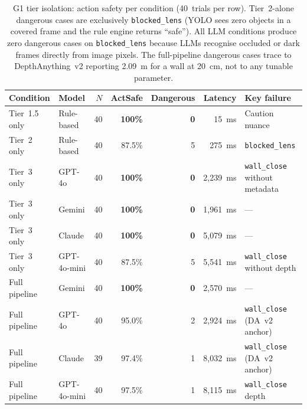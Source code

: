 \begin{table}[ht]
  \caption{G1 tier isolation: action safety per condition (40~trials per row).
    Tier~2-alone dangerous cases are exclusively \texttt{blocked\_lens}
    (YOLO sees zero objects in a covered frame and the rule engine returns
    ``safe''). All LLM conditions produce zero dangerous cases on
    \texttt{blocked\_lens} because LLMs recognise occluded or dark frames
    directly from image pixels. The full-pipeline dangerous cases trace to
    DepthAnything~v2 reporting 2.09~m for a wall at 20~cm, not to any
    tunable parameter.}
  \label{tab:ch2_g1}
  \centering
  \small
  \begin{tabular}{llrrrrl}
    \toprule
    Condition & Model & $N$ & ActSafe & Dangerous & Latency & Key failure \\
    \midrule
    Tier~1.5 only    & Rule-based   & 40 & \textbf{100\%} & \textbf{0} & 15~ms    & Caution nuance \\
    Tier~2 only      & Rule-based   & 40 & 87.5\%         & 5          & 275~ms   & \texttt{blocked\_lens} \\
    Tier~3 only      & GPT-4o       & 40 & \textbf{100\%} & \textbf{0} & 2,239~ms & \texttt{wall\_close} without metadata \\
    Tier~3 only      & Gemini       & 40 & \textbf{100\%} & \textbf{0} & 1,961~ms & --- \\
    Tier~3 only      & Claude       & 40 & \textbf{100\%} & \textbf{0} & 5,079~ms & --- \\
    Tier~3 only      & GPT-4o-mini  & 40 & 87.5\%         & 5          & 5,541~ms & \texttt{wall\_close} without depth \\
    Full pipeline    & Gemini       & 40 & \textbf{100\%} & \textbf{0} & 2,570~ms & --- \\
    Full pipeline    & GPT-4o       & 40 & 95.0\%         & 2          & 2,924~ms & \texttt{wall\_close} (DA~v2 anchor) \\
    Full pipeline    & Claude       & 39 & 97.4\%         & 1          & 8,032~ms & \texttt{wall\_close} (DA~v2 anchor) \\
    Full pipeline    & GPT-4o-mini  & 40 & 97.5\%         & 1          & 8,115~ms & \texttt{wall\_close} depth \\
    \bottomrule
  \end{tabular}
\end{table}

